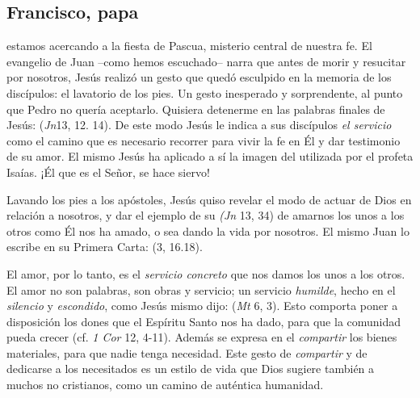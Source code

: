 \subsection{Francisco, papa}



\begin{body}
 estamos acercando a la fiesta de Pascua, misterio central de nuestra fe. El evangelio de Juan –como hemos escuchado– narra que antes de morir y resucitar por nosotros, Jesús realizó un gesto que quedó esculpido en la memoria de los discípulos: el lavatorio de los pies. Un gesto inesperado y sorprendente, al punto que Pedro no quería aceptarlo. Quisiera detenerme en las palabras finales de Jesús:  (\textit{Jn}13, 12. 14). De este modo Jesús le indica a sus discípulos \textit{el servicio} como el camino que es necesario recorrer para vivir la fe en Él y dar testimonio de su amor. El mismo Jesús ha aplicado a sí la imagen del  utilizada por el profeta Isaías. ¡Él que es el Señor, se hace siervo!

Lavando los pies a los apóstoles, Jesús quiso revelar el modo de actuar de Dios en relación a nosotros, y dar el ejemplo de su  \textit{(Jn} 13, 34) de amarnos los unos a los otros como Él nos ha amado, o sea dando la vida por nosotros. El mismo Juan lo escribe en su Primera Carta:  (3, 16.18).

El amor, por lo tanto, es el \textit{servicio concreto} que nos damos los unos a los otros. El amor no son palabras, son obras y servicio; un servicio \textit{humilde}, hecho en el \textit{silencio} y \textit{escondido}, como Jesús mismo dijo:  (\textit{Mt} 6, 3). Esto comporta poner a disposición los dones que el Espíritu Santo nos ha dado, para que la comunidad pueda crecer (cf. \textit{1 Cor} 12, 4-11). Además se expresa en el \textit{compartir} los bienes materiales, para que nadie tenga necesidad. Este gesto de \textit{compartir} y de dedicarse a los necesitados es un estilo de vida que Dios sugiere también a muchos no cristianos, como un camino de auténtica humanidad.


\end{body}
